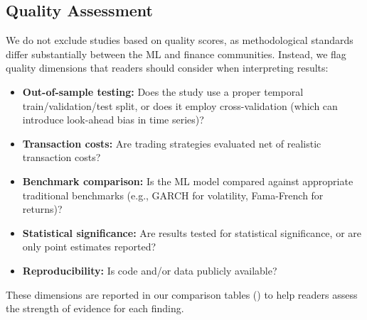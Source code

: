 \subsection{Quality Assessment}

We do not exclude studies based on quality scores, as methodological standards differ substantially between the ML and finance communities. Instead, we flag quality dimensions that readers should consider when interpreting results:

\begin{itemize}[leftmargin=*]
    \item \textbf{Out-of-sample testing:} Does the study use a proper temporal train/validation/test split, or does it employ cross-validation (which can introduce look-ahead bias in time series)?
    \item \textbf{Transaction costs:} Are trading strategies evaluated net of realistic transaction costs?
    \item \textbf{Benchmark comparison:} Is the ML model compared against appropriate traditional benchmarks (e.g., GARCH for volatility, Fama-French for returns)?
    \item \textbf{Statistical significance:} Are results tested for statistical significance, or are only point estimates reported?
    \item \textbf{Reproducibility:} Is code and/or data publicly available?
\end{itemize}

These dimensions are reported in our comparison tables () to help readers assess the strength of evidence for each finding.
